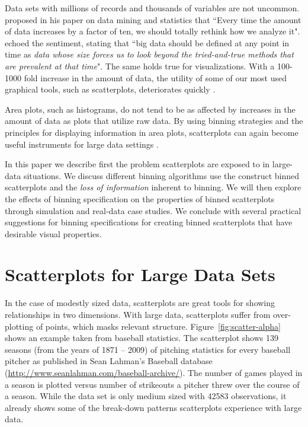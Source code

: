 Data sets with millions of records and thousands of variables are not uncommon. \citet{Friedman97} proposed in his paper on data mining and statistics that ``Every time the amount of data increases by a factor of ten, we should totally rethink how we analyze it". \citet{jacobs2009} echoed the sentiment, stating that ``big data should be defined at any point in time as \textit{data whose size forces us to look beyond the tried-and-true methods that are prevalent at that time}". The same holds true for visualizations. With a 100-1000 fold increase in the amount of data, the utility of some of our most used graphical tools, such as scatterplots, deteriorates quickly \citep{gold}. 

Area plots, such as histograms, do not tend to be as affected by increases in the amount of data as plots that utilize raw data. By using binning strategies and the principles for displaying information in area plots, scatterplots can again become useful instruments for large data settings \citep{gold}.

In this paper we describe first the problem scatterplots are exposed to in large-data situations. We discuss different binning algorithms use the construct binned scatterplots and the  {\it loss of information} inherent to binning. We will then explore the effects of binning specification on the properties of binned scatterplots through simulation and real-data case studies. We conclude with several practical suggestions for binning specifications for creating binned scatterplots that have desirable visual properties. 

\section{Scatterplots for Large Data Sets}
\label{Scatter}

In the case of modestly sized data, scatterplots are great tools for showing relationships in two dimensions. With large data, scatterplots suffer from over-plotting of points, which masks relevant structure. Figure~\ref{fig:scatter-alpha} shows an example taken from baseball statistics. The scatterplot shows 139 seasons (from the years of 1871 -- 2009) of  pitching statistics for every baseball pitcher as published in Sean Lahman's Baseball database (\url{http://www.seanlahman.com/baseball-archive/}).  The number of games played in a season is plotted versus number of strikeouts a pitcher threw over the course of a season. While the data set is only medium sized with 42583 observations, it already shows some of the break-down patterns scatterplots experience with large data. 

